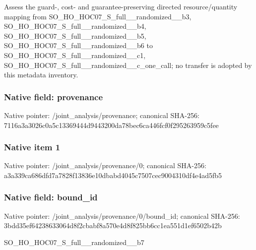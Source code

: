 \documentclass[10pt,a4paper]{article}
\begin{document}
\begingroup\raggedright\sloppy Assess the guard-,\allowbreak{} cost- and guarantee-preserving directed resource/\allowbreak{}quantity mapping from SO\_\allowbreak{}HO\_\allowbreak{}HOC07\_\allowbreak{}S\_\allowbreak{}full\_\allowbreak{}\_\allowbreak{}randomized\_\allowbreak{}\_\allowbreak{}b3,\allowbreak{} SO\_\allowbreak{}HO\_\allowbreak{}HOC07\_\allowbreak{}S\_\allowbreak{}full\_\allowbreak{}\_\allowbreak{}randomized\_\allowbreak{}\_\allowbreak{}b4,\allowbreak{} SO\_\allowbreak{}HO\_\allowbreak{}HOC07\_\allowbreak{}S\_\allowbreak{}full\_\allowbreak{}\_\allowbreak{}randomized\_\allowbreak{}\_\allowbreak{}b5,\allowbreak{} SO\_\allowbreak{}HO\_\allowbreak{}HOC07\_\allowbreak{}S\_\allowbreak{}full\_\allowbreak{}\_\allowbreak{}randomized\_\allowbreak{}\_\allowbreak{}b6 to SO\_\allowbreak{}HO\_\allowbreak{}HOC07\_\allowbreak{}S\_\allowbreak{}full\_\allowbreak{}\_\allowbreak{}randomized\_\allowbreak{}\_\allowbreak{}c1,\allowbreak{} SO\_\allowbreak{}HO\_\allowbreak{}HOC07\_\allowbreak{}S\_\allowbreak{}full\_\allowbreak{}\_\allowbreak{}randomized\_\allowbreak{}\_\allowbreak{}c\_\allowbreak{}one\_\allowbreak{}call;\allowbreak{} no transfer is adopted by this metadata inventory.\par\endgroup

\subsubsection{Native field: provenance}
Native pointer: /joint\_\allowbreak{}analysis/provenance; canonical SHA-256: 7116a3a3026c0a5c13369444d9443200da78bec6ca446fcf0f295263959c5fee

\subsubsection{Native item 1}
Native pointer: /joint\_\allowbreak{}analysis/provenance/0; canonical SHA-256: a3a339ca686dfd7a7828f13836e10dbabd4045c7507cec9004310df4e4ad5fb5

\subsubsection{Native field: bound\_\allowbreak{}id}
Native pointer: /joint\_\allowbreak{}analysis/provenance/0/bound\_\allowbreak{}id; canonical SHA-256: 3bdd35ef64238633064d8f2cbabf8a570e4d8f825bb6cc1ea551d1ef6502b42b

\begingroup\raggedright\sloppy SO\_\allowbreak{}HO\_\allowbreak{}HOC07\_\allowbreak{}S\_\allowbreak{}full\_\allowbreak{}\_\allowbreak{}randomized\_\allowbreak{}\_\allowbreak{}b7\par\endgroup
\end{document}

